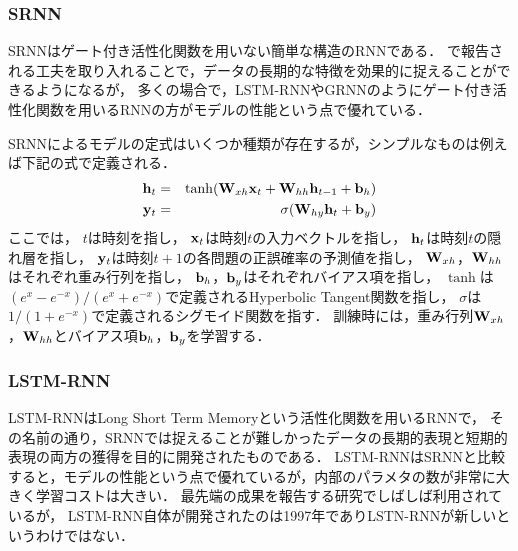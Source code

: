\subsubsection{SRNN}
SRNNはゲート付き活性化関数を用いない簡単な構造のRNNである．
\cite{le2015simple, krueger2015regularizing}で報告される工夫を取り入れることで，データの長期的な特徴を効果的に捉えることができるようになるが，
多くの場合で，LSTM-RNNやGRNNのようにゲート付き活性化関数を用いるRNNの方がモデルの性能という点で優れている．

SRNNによるモデルの定式はいくつか種類が存在するが，シンプルなものは例えば下記の式で定義される．
\begin{eqnarray}
\label{eq:srnn1}
{\bf h}_t &=& \tanh({\bf W}_{xh} {\bf x}_t + {\bf W}_{hh}  {\bf h}_{t-1} + {\bf b}_h)\\
\label{eq:srnn2}
{\bf y}_t &=& \sigma( {\bf W}_{hy} {\bf h}_t + {\bf b}_y)
\end{eqnarray}
ここでは，
$t$は時刻を指し，
${\bf x}_t$は時刻$t$の入力ベクトルを指し，
${\bf h}_t$は時刻$t$の隠れ層を指し，
${\bf y}_t$は時刻$t+1$の各問題の正誤確率の予測値を指し，
${\bf W}_{xh}$，${\bf W}_{hh}$はそれぞれ重み行列を指し，
${\bf b}_h$，${\bf b}_y$はそれぞれバイアス項を指し，
$\tanh$は$( e^x - e^{-x} )/( e^x + e^{-x} )$で定義されるHyperbolic Tangent関数を指し，
$\sigma$は$1 / (1 + e^{-x})$で定義されるシグモイド関数を指す．
訓練時には，重み行列${\bf W}_{xh}$，${\bf W}_{hh}$とバイアス項${\bf b}_h$，${\bf b}_y$を学習する．


\subsubsection{LSTM-RNN}
LSTM-RNNはLong Short Term Memoryという活性化関数を用いるRNNで，
その名前の通り，SRNNでは捉えることが難しかったデータの長期的表現と短期的表現の両方の獲得を目的に開発されたものである\cite{hochreiter1997long}．
LSTM-RNNはSRNNと比較すると，モデルの性能という点で優れているが，内部のパラメタの数が非常に大きく学習コストは大きい．
最先端の成果を報告する研究でしばしば利用されているが，
LSTM-RNN自体が開発されたのは1997年でありLSTN-RNNが新しいというわけではない．


